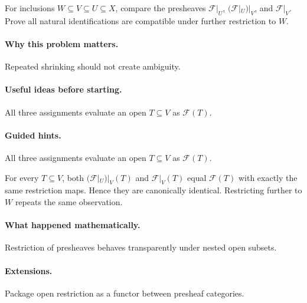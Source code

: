 \begin{problem}
For inclusions $W\subseteq V\subseteq U\subseteq X$, compare the presheaves $\mathcal F|_U$, $(\mathcal F|_U)|_V$, and $\mathcal F|_V$.  Prove all natural identifications are compatible under further restriction to $W$.
\end{problem}

\paragraph{Why this problem matters.}
Repeated shrinking should not create ambiguity.

\paragraph{Useful ideas before starting.}
All three assignments evaluate an open $T\subseteq V$ as $\mathcal F(T)$.

\paragraph{Guided hints.}
All three assignments evaluate an open $T\subseteq V$ as $\mathcal F(T)$.

\begin{solution}
For every $T\subseteq V$, both $(\mathcal F|_U)|_V(T)$ and $\mathcal F|_V(T)$ equal $\mathcal F(T)$ with exactly the same restriction maps.  Hence they are canonically identical.  Restricting further to $W$ repeats the same observation.
\end{solution}

\paragraph{What happened mathematically.}
Restriction of presheaves behaves transparently under nested open subsets.

\paragraph{Extensions.}
Package open restriction as a functor between presheaf categories.

